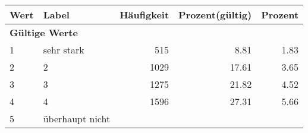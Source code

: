      \begin{longtable}{lXrrr}
     \toprule
     \textbf{Wert} & \textbf{Label} & \textbf{Häufigkeit} & \textbf{Prozent(gültig)} & \textbf{Prozent} \\
     \endhead
     \midrule
     \multicolumn{5}{l}{\textbf{Gültige Werte}}\\

     1 &
     \multicolumn{1}{X}{ sehr stark   } &


       \num{515} &
       \num[round-mode=places,round-precision=2]{8,81} &
         \num[round-mode=places,round-precision=2]{1,83} \\

     2 &
     \multicolumn{1}{X}{ 2   } &


       \num{1029} &
       \num[round-mode=places,round-precision=2]{17,61} &
         \num[round-mode=places,round-precision=2]{3,65} \\

     3 &
     \multicolumn{1}{X}{ 3   } &


       \num{1275} &
       \num[round-mode=places,round-precision=2]{21,82} &
         \num[round-mode=places,round-precision=2]{4,52} \\

     4 &
     \multicolumn{1}{X}{ 4   } &


       \num{1596} &
       \num[round-mode=places,round-precision=2]{27,31} &
         \num[round-mode=places,round-precision=2]{5,66} \\

     5 &
     \multicolumn{1}{X}{ überhaupt nicht   } &



\end{longtable}
